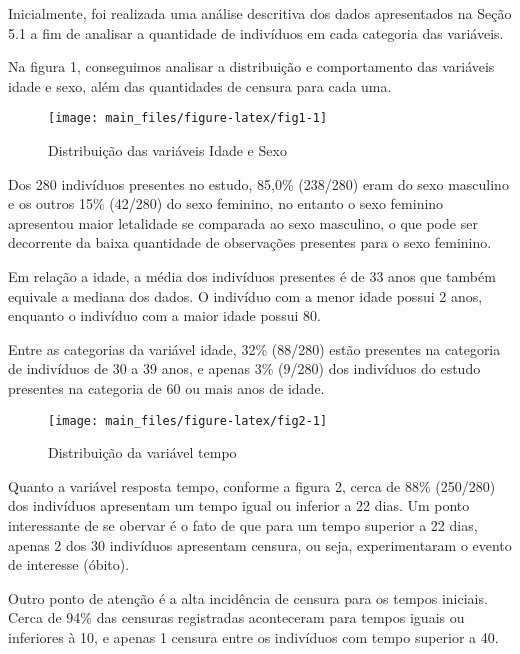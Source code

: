 \documentclass[
	12pt,				%
	openright,			%
	oneside,			%
	a4paper,			%
	brazil				%
	]{abntex2}
\begin{document}
Inicialmente, foi realizada uma análise descritiva dos dados apresentados na Seção 5.1 a fim de analisar a quantidade de indivíduos em cada categoria das variáveis.

Na figura 1, conseguimos analisar a distribuição e comportamento das variáveis idade e sexo, além das quantidades de censura para cada uma.

\begin{figure}[!h]

{\centering \texttt{[image: main\_files/figure-latex/fig1-1]} 

}

\caption{Distribuição das variáveis Idade e Sexo}\label{fig:fig1}
\end{figure}

Dos 280 indivíduos presentes no estudo, 85,0\% (238/280) eram do sexo masculino e os outros 15\% (42/280) do sexo feminino, no entanto o sexo feminino apresentou maior letalidade se comparada ao sexo masculino, o que pode ser decorrente da baixa quantidade de observações presentes para o sexo feminino.

Em relação a idade, a média dos indivíduos presentes é de 33 anos que também equivale a mediana dos dados. O indivíduo com a menor idade possui 2 anos, enquanto o indivíduo com a maior idade possui 80.

Entre as categorias da variável idade, 32\% (88/280) estão presentes na categoria de indivíduos de 30 a 39 anos, e apenas 3\% (9/280) dos indivíduos do estudo presentes na categoria de 60 ou mais anos de idade.

\begin{figure}[!h]

{\centering \texttt{[image: main\_files/figure-latex/fig2-1]} 

}

\caption{Distribuição da variável tempo}\label{fig:fig2}
\end{figure}

Quanto a variável resposta tempo, conforme a figura 2, cerca de 88\% (250/280) dos indivíduos apresentam um tempo igual ou inferior a 22 dias. Um ponto interessante de se obervar é o fato de que para um tempo superior a 22 dias, apenas 2 dos 30 indivíduos apresentam censura, ou seja, experimentaram o evento de interesse (óbito).

Outro ponto de atenção é a alta incidência de censura para os tempos iniciais. Cerca de 94\% das censuras registradas aconteceram para tempos iguais ou inferiores à 10, e apenas 1 censura entre os indivíduos com tempo superior a 40.
\end{document}
